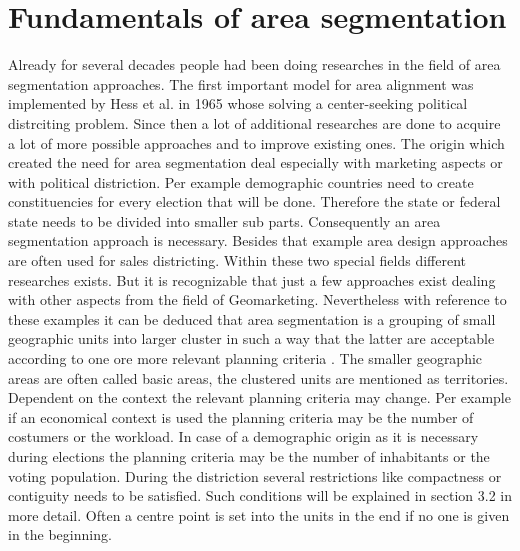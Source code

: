 \section{Fundamentals of area segmentation}

Already for several decades people had been doing researches in the field of area segmentation approaches. The first important model for area alignment was implemented by Hess et al. in 1965 whose solving a center-seeking political distrciting problem\cite{hess}. Since then a lot of additional researches are done to acquire a lot of more possible approaches and to improve existing ones. The origin which created the need for area segmentation deal especially with marketing aspects or with political distriction. Per example demographic countries need to create constituencies for every election that will be done. Therefore the state or federal state needs to be divided into smaller sub parts. Consequently an area segmentation approach is necessary. Besides that example area design approaches are often used for sales districting. Within these two special fields different researches exists. But it is recognizable that just a few approaches exist dealing with other aspects from the field of Geomarketing. Nevertheless with reference to these examples it can be deduced that area segmentation is a grouping of small geographic units into larger cluster in such a way that the latter are acceptable according to one ore more relevant planning criteria \cite{kalcsics, zoltner}. The smaller geographic areas are often called basic areas, the clustered units are mentioned as territories. Dependent on the context the relevant planning criteria may change. Per example if an economical context is used the planning criteria may be the number of costumers or the workload. In case of a demographic origin as it is necessary during elections the planning criteria may be the number of inhabitants or the voting population. During the distriction several restrictions like compactness or contiguity needs to be satisfied. Such conditions will be explained in section 3.2 in more detail. Often a centre point is set into the units in the end if no one is given in the beginning.\\
